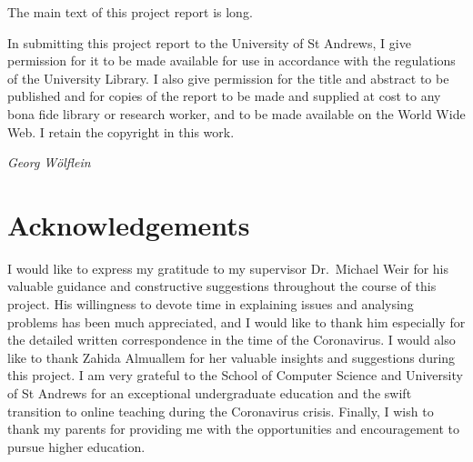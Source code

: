 The main text of this project report is  long.

In submitting this project report to the University of St Andrews, I give permission for it to be made available for use in accordance with the regulations of the University Library. 
I also give permission for the title and abstract to be published and for copies of the report to be made and supplied at cost to any bona fide library or research worker, and to be made available on the World Wide Web.
I retain the copyright in this work.

\vspace{0.5cm}

\textit{Georg Wölflein}

\chapter*{Acknowledgements}
I would like to express my gratitude to my supervisor Dr.~Michael Weir for his valuable guidance and constructive suggestions throughout the course of this project. 
His willingness to devote time in explaining issues and analysing problems has been much appreciated, and I would like to thank him especially for the detailed written correspondence in the time of the Coronavirus.
I would also like to thank Zahida Almuallem for her valuable insights and suggestions during this project.
I am very grateful to the School of Computer Science and University of St Andrews for an exceptional undergraduate education and the swift transition to online teaching during the Coronavirus crisis.
Finally, I wish to thank my parents for providing me with the opportunities and encouragement to pursue higher education.

\tableofcontents
\listoffigures

